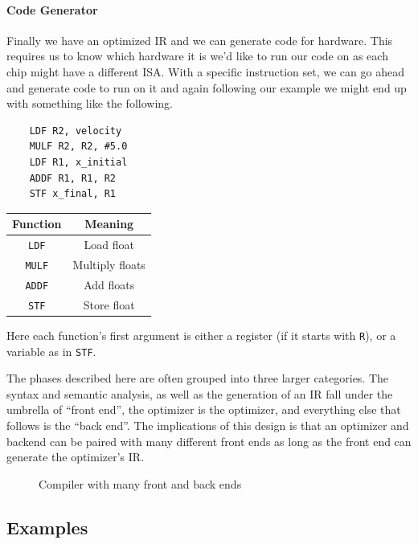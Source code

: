 \paragraph{Code Generator}
Finally we have an optimized \ac{IR} and we can generate code for hardware.
This requires us to know which hardware it is we'd like to run our code on as each chip might have a different \ac{ISA}.
With a specific instruction set, we can go ahead and generate code to run on it and again following our example we might end up with something like the following.

\begin{minipage}{0.5\textwidth}
    \begin{lstlisting}
    LDF R2, velocity
    MULF R2, R2, #5.0
    LDF R1, x_initial
    ADDF R1, R1, R2
    STF x_final, R1
\end{lstlisting}
\end{minipage}
\begin{minipage}{0.5\textwidth}
    \centering
    \begin{tabular}{cc}
        Function      & Meaning         \\ \toprule
        \texttt{LDF}  & Load float      \\
        \texttt{MULF} & Multiply floats \\
        \texttt{ADDF} & Add floats      \\
        \texttt{STF}  & Store float
    \end{tabular}
    \label{fig:machcode}
\end{minipage}
Here each function's first argument is either a register (if it starts with \texttt{R}), or a variable as in \texttt{STF}.

The phases described here are often grouped into three larger categories.
The syntax and semantic analysis, as well as the generation of an \ac{IR} fall under the umbrella of ``front end'', the optimizer is the optimizer, and everything else that follows is the ``back end''.
The implications of this design is that an optimizer and backend can be paired with many different front ends as long as the front end can generate the optimizer's \ac{IR}.
\begin{figure}[ht]
    \centering
    
    \caption{Compiler with many front and back ends}\label{fig:compends}
\end{figure}

\subsection{Examples}\label{sec:compiler-examples}

